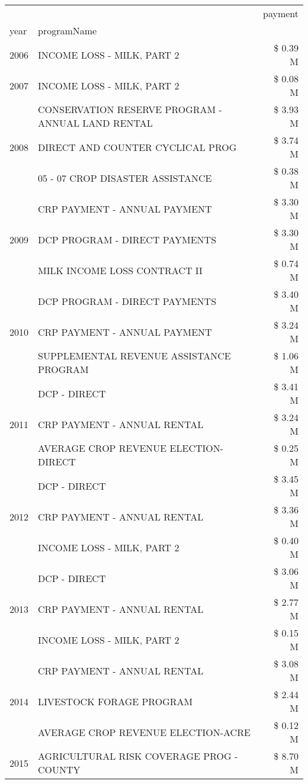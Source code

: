 \begin{tabular}{llr}
\toprule
 &  & payment \\
year & programName &  \\
\midrule
2006 & INCOME LOSS - MILK, PART 2 & \$ 0.39 M \\
\cline{1-3}
2007 & INCOME LOSS - MILK, PART 2 & \$ 0.08 M \\
\cline{1-3}
\multirow[t]{3}{*}{2008} & CONSERVATION RESERVE PROGRAM - ANNUAL LAND RENTAL & \$ 3.93 M \\
 & DIRECT AND COUNTER CYCLICAL PROG & \$ 3.74 M \\
 & 05 - 07 CROP DISASTER ASSISTANCE & \$ 0.38 M \\
\cline{1-3}
\multirow[t]{3}{*}{2009} & CRP PAYMENT - ANNUAL PAYMENT & \$ 3.30 M \\
 & DCP PROGRAM - DIRECT PAYMENTS & \$ 3.30 M \\
 & MILK INCOME LOSS CONTRACT II & \$ 0.74 M \\
\cline{1-3}
\multirow[t]{3}{*}{2010} & DCP PROGRAM - DIRECT PAYMENTS & \$ 3.40 M \\
 & CRP PAYMENT - ANNUAL PAYMENT & \$ 3.24 M \\
 & SUPPLEMENTAL REVENUE ASSISTANCE PROGRAM & \$ 1.06 M \\
\cline{1-3}
\multirow[t]{3}{*}{2011} & DCP - DIRECT & \$ 3.41 M \\
 & CRP PAYMENT - ANNUAL RENTAL & \$ 3.24 M \\
 & AVERAGE CROP REVENUE ELECTION-DIRECT & \$ 0.25 M \\
\cline{1-3}
\multirow[t]{3}{*}{2012} & DCP - DIRECT & \$ 3.45 M \\
 & CRP PAYMENT - ANNUAL RENTAL & \$ 3.36 M \\
 & INCOME LOSS - MILK, PART 2 & \$ 0.40 M \\
\cline{1-3}
\multirow[t]{3}{*}{2013} & DCP - DIRECT & \$ 3.06 M \\
 & CRP PAYMENT - ANNUAL RENTAL & \$ 2.77 M \\
 & INCOME LOSS - MILK, PART 2 & \$ 0.15 M \\
\cline{1-3}
\multirow[t]{3}{*}{2014} & CRP PAYMENT - ANNUAL RENTAL & \$ 3.08 M \\
 & LIVESTOCK FORAGE PROGRAM & \$ 2.44 M \\
 & AVERAGE CROP REVENUE ELECTION-ACRE & \$ 0.12 M \\
\cline{1-3}
\multirow[t]{3}{*}{2015} & AGRICULTURAL RISK COVERAGE PROG - COUNTY & \$ 8.70 M \\

\end{tabular}
